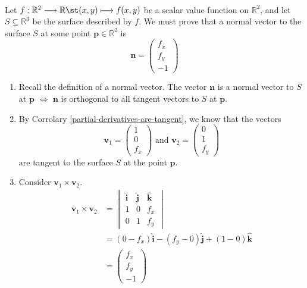\documentclass[12pt]{book}
\makeatletter
\newcommand{\rbb}{\mathbb{R}}
\theoremstyle{definitionstyle}
\renewenvironment{proof}[1][\proofname]{\par
  \pushQED{\qed}%
  \normalfont \topsep6\p@\@plus6\p@\relax
  \trivlist
  \item[\hskip\labelsep
		\bfseries
	#1\@addpunct{.}]\ignorespaces
}{
  \popQED\endtrivlist\@endpefalse
}
\numberwithin{equation}{section}
\makeatother
\begin{document}
\begin{proof}[Proof of Theorem \ref{normal-vector-scalar-value-function} for scalar value functions on $\rbb^2$]
    \noindent \\
    Let $\func[(x,y)][f(x,y)]{f}{\rbb^2}{\rbb}$ be a scalar value function on $\rbb^2$, and let $S \subseteq \rbb^3$ be the surface described by $f$.
    We must prove that a normal vector to the surface $S$ at some point $\mathbf{p} \in \rbb^2$ is $$\mathbf{n} = \begin{pmatrix} f_x \\ f_y \\ -1 \end{pmatrix}$$

    \begin{enumerate}
	\item Recall the definition of a normal vector. The vector $\mathbf{n}$ is a normal vector to $S$ at $\mathbf{p}$ $\iff$ $\mathbf{n}$ is orthogonal to all tangent vectors to $S$ at $\mathbf{p}$.
	\item By Corrolary \ref{partial-derivatives-are-tangent}, we know that the vectors
	    \begin{equation}
		\mathbf{v}_1 = \begin{pmatrix} 1 \\ 0 \\ f_x \end{pmatrix} \text{ and } \mathbf{v}_2 = \begin{pmatrix} 0 \\ 1 \\ f_y \end{pmatrix}
	    \end{equation}
	    are tangent to the surface $S$ at the point $\mathbf{p}$.
	\item Consider $\mathbf{v}_1 \times \mathbf{v}_2$.
	    \begin{equation}
		\begin{split}
		    \mathbf{v}_1 \times \mathbf{v}_2 & = \begin{vmatrix} \mathbf{\hat{i}} & \mathbf{\hat{j}} & \mathbf{\hat{k}} \\ 1 & 0 & f_x \\ 0 & 1 & f_y \end{vmatrix} \\
		    & = (0 - f_x)\mathbf{\hat{i}} - (f_y - 0)\mathbf{\hat{j}} + (1 - 0)\mathbf{\hat{k}} \\
		    & = \begin{pmatrix} f_x \\ f_y \\ -1 \end{pmatrix} \\

\end{split}
\end{equation}
\end{enumerate}
\end{proof}
\end{document}

